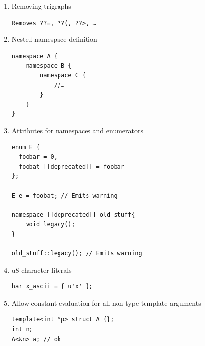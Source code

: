 \documentclass[12pt]{article}
\begin{document}
{\begin{enumerate}
\begin{lstlisting}
foo<std::vector> my_foo;\\
\end{lstlisting}
\item Removing trigraphs
\begin{lstlisting}
Removes ??=, ??(, ??>, …
\end{lstlisting}
\item Nested namespace definition
\begin{lstlisting}
namespace A {
    namespace B {
        namespace C {
            //…
        }
    }
}
\end{lstlisting}
\item Attributes for namespaces and enumerators
\begin{lstlisting}
enum E {
  foobar = 0,
  foobat [[deprecated]] = foobar
};

E e = foobat; // Emits warning

namespace [[deprecated]] old_stuff{
    void legacy();
}

old_stuff::legacy(); // Emits warning
\end{lstlisting}
\item u8 character literals
\begin{lstlisting}
har x_ascii = { u'x' };
\end{lstlisting}
\item Allow constant evaluation for all non-type template arguments
\begin{lstlisting}
template<int *p> struct A {};
int n;
A<&n> a; // ok


\end{lstlisting}
\end{enumerate}}
\end{document}
